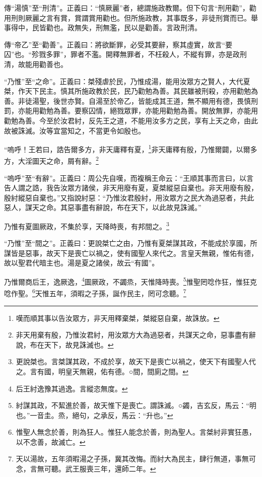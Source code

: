 {\noindent\zhuan{}\fzbyks 傳“湯慎”至“刑清”。正義曰：“慎厥麗”者，總謂施政教爾。但下句言“刑用勸”，勸用刑則厥麗之言有賞，賞謂賞用勸也。但所施政教，其事既多，非徒刑賞而已。舉事得中，民皆勸也。政無失，刑無濫，民以是勸善。言政刑清。 \par}

{\noindent\zhuan{}\fzbyks 傳“帝乙”至“勸善”。正義曰：將欲斷罪，必受其要辭，察其虛實，故言“要囚”也。“殄戮多罪”，罪者不濫。開釋無罪者，不枉殺人，不縱有罪，亦是政刑清，故能用勸善也。 \par}

{\noindent\shu{}\fzkt “乃惟”至“之命”。正義曰：桀殘虐於民，乃惟成湯，能用汝眾方之賢人，大代夏桀，作天下民主。慎其所施政教於民，民乃勸勉為善。其民雖被刑殺，亦用勸勉為善。非徒湯聖，後世亦賢。自湯至於帝乙，皆能成其王道，無不顯用有德，畏慎刑罰，亦能用勸勉為善。要察囚情，絕戮眾罪，亦能用勸勉為善。開放無罪，亦能用勸勉為善。今至於汝君紂，反先王之道，不能用汝多方之民，享有上天之命，由此故被誅滅。汝等宜當知之，不當更令如殷也。 \par}

“嗚呼！王若曰，誥告爾多方，非天庸釋有夏，\footnote{嘆而順其事以告汝眾方，非天用釋棄桀，桀縱惡自棄，故誅放。}非天庸釋有殷，乃惟爾闢，以爾多方，大淫圖天之命，屑有辭。\footnote{非天用棄有殷，乃惟汝君紂，用汝眾方大為過惡者，共謀天之命，惡事盡有辭說，布在天下，故見誅滅也。}

{\noindent\shu{}\fzkt “嗚呼”至“有辭”。正義曰：周公先自嘆，而複稱王命云：“王順其事而言曰，以言告人謂之誥，我告汝眾方諸侯，非天用廢有夏，夏桀縱惡自棄也。非天用廢有殷，殷紂縱惡自棄也。”又指說紂惡：“乃惟汝君殷紂，用汝眾方之民大為過惡者，共此惡人，謀天之命。其惡事盡有辭說，布在天下，以此故見誅滅。” \par}

乃惟有夏圖厥政，不集於享，天降時喪，有邦間之。\footnote{更說桀也。言桀謀其政，不成於享，故天下是喪亡以禍之，使天下有國聖人代之。言有國，明皇天無親，佑有德。○間，間廁之間。}

{\noindent\shu{}\fzkt “乃惟”至“間之”。正義曰：更說桀亡之由，乃惟有夏桀謀其政，不能成於享國，所謀皆是惡事，故天下是喪亡以禍之，使有國聖人來代之。言皇天無親，惟佑有德，故以聖君代暗主也。湯是夏之諸侯，故云“有國”。 \par}

乃惟爾商后王，逸厥逸，\footnote{后王紂逸豫其過逸。言縱恣無度。}圖厥政，不蠲烝，天惟降時喪。\footnote{紂謀其政，不絜進於善，故天惟下是喪亡。謂誅滅。○蠲，吉玄反，馬云：“明也。”一音圭。烝，絕句，之承反，馬云：“升也。”}惟聖罔唸作狂，惟狂克唸作聖。\footnote{惟聖人無念於善，則為狂人。惟狂人能念於善，則為聖人。言桀紂非實狂愚，以不念善，故滅亡。}天惟五年，須暇之子孫，誕作民主，罔可念聽。\footnote{天以湯故，五年須暇湯之子孫，冀其改悔。而紂大為民主，肆行無道，事無可念，言無可聽。武王服喪三年，還師二年。}


